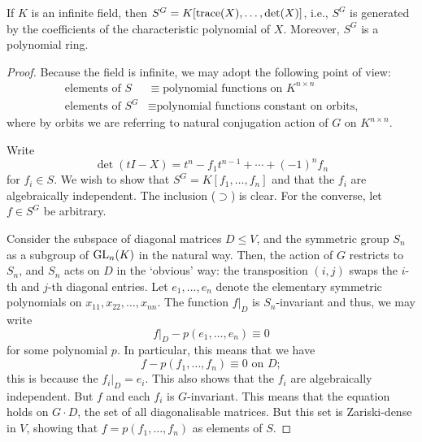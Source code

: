 \documentclass[12pt]{article}
\begin{document}
	\begin{thm}
		If $K$ is an infinite field, then $S^{G} = K[\operatorname{trace}(X), \ldots, \det(X)]$, i.e., $S^{G}$ is generated by the coefficients of the characteristic polynomial of $X$. 
		Moreover, $S^{G}$ is a polynomial ring.
	\end{thm}

	\begin{proof} 
		Because the field is infinite, we may adopt the following point of view:
		\begin{align*} 
			\text{elements of $S$} & \equiv \text{polynomial functions on $K^{n \times n}$} \\
			\text{elements of $S^{G}$} & \equiv \text{polynomial functions constant on orbits,}
		\end{align*}
		where by orbits we are referring to natural conjugation action of $G$ on $K^{n \times n}$.

		Write
		\begin{equation*} 
			\det(tI - X) = t^{n} - f_{1} t^{n - 1} + \cdots + (-1)^{n} f_{n}
		\end{equation*}
		for $f_{i} \in S$. 
		We wish to show that $S^{G} = K[f_{1}, \ldots, f_{n}]$ and that the $f_{i}$ are algebraically independent. 
		The inclusion ($\supset$) is clear. 
		For the converse, let $f \in S^{G}$ be arbitrary. 

		Consider the subspace of diagonal matrices $D \le V$, and the symmetric group $S_{n}$ as a subgroup of $\operatorname{GL}_{n}(K)$ in the natural way. 
		Then, the action of $G$ restricts to $S_{n}$, and $S_{n}$ acts on $D$ in the `obvious' way: the transposition $(i, j)$ swaps the $i$-th and $j$-th diagonal entries. 
		Let $e_{1}, \ldots, e_{n}$ denote the elementary symmetric polynomials on $x_{11}, x_{22}, \ldots, x_{nn}$.
		The function $f|_{D}$ is $S_{n}$-invariant and thus, we may write
		\begin{equation*} 
			f|_{D} - p(e_{1}, \ldots, e_{n}) \equiv 0
		\end{equation*}
		for some polynomial $p$.
		In particular, this means that we have
		\begin{equation} \tag{$\dagger$} \label{eq:001}
			f - p(f_{1}, \ldots, f_{n}) \equiv 0 \text{ on $D$};
		\end{equation}
		this is because the $f_{i}|_{D} = e_{i}$. 
		This also shows that the $f_{i}$ are algebraically independent. 
		But $f$ and each $f_{i}$ is $G$-invariant. 
		This means that the equation  holds on $G \cdot D$, the set of all diagonalisable matrices. 
		But this set is Zariski-dense in $V$, showing that $f = p(f_{1}, \ldots, f_{n})$ as elements of $S$.
	\end{proof}
\end{document}

